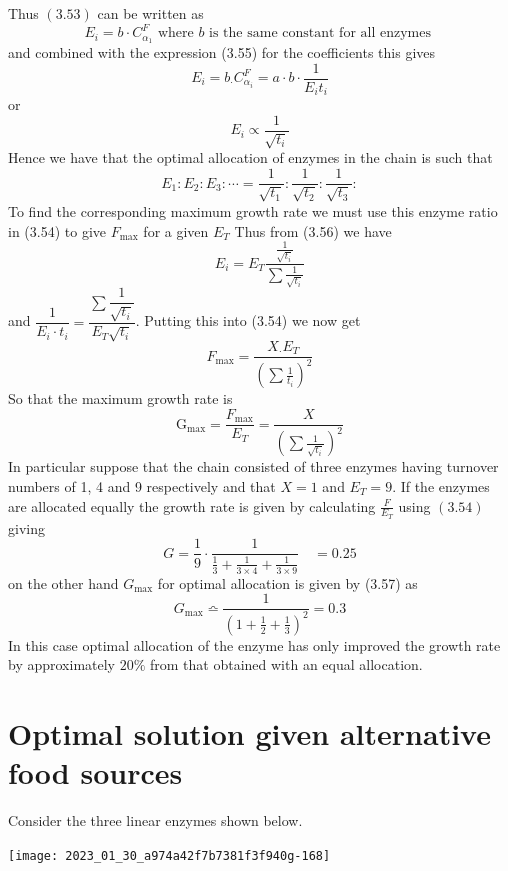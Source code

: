 Thus $(3.53)$ can be written as
%
$$
E_{i}=b \cdot C_{\alpha_{1}}^{F} \text { where } b \text { is the same constant for all enzymes }
$$
%
and combined with the expression (3.55) for the coefficients this gives
%
$$
E_{i}=b_{\cdot} C_{\alpha_{i}}^{F} = a \cdot b \cdot \frac{1}{E_{i} t_{i}}
$$
%
or
%
$$
E_{i} \propto \frac{1}{\sqrt{t_{i}}}
$$
%
Hence we have that the optimal allocation of enzymes in the chain is such that
%
\begin{equation}
E_{1}: E_{2}: E_{3}: \cdots=\frac{1}{\sqrt{t_{1}}}: \frac{1}{\sqrt{t_{2}}}: \frac{1}{\sqrt{t_{3}}}:
\label{eqn:356}
\end{equation}
%
To find the corresponding maximum growth rate we must use this enzyme ratio in (3.54) to give $F_{\max}$ for a given $E_{T}$ Thus from (3.56) we have
%
$$
E_{i} = E_{T} \frac{\frac{1}{\sqrt{t_{i}}}}{\sum \frac{1}{\sqrt{t_{i}}}}
$$
%
and $\dfrac{1}{E_{i} \cdot t_{i}} = \dfrac{\sum \dfrac{1}{\sqrt{t_{i}}}}{E_{T} \sqrt{t_{i}}}$. Putting this into (3.54) we now get
%
$$
F_{\max} = \frac{X_{\cdot} E_{T}}{\left(\sum \frac{1}{t_{i}}\right)^{2}}
$$
%
So that the maximum growth rate is
%
\begin{equation}
\mathrm{G}_{\max } = \frac{F_{\max}}{E_{T}} = \frac{X}{\left(\sum \frac{1}{\sqrt{t_{i}}}\right)^{2}}
\label{eqn:357}
\end{equation}
%
In particular suppose that the chain consisted of three enzymes having turnover numbers of 1, 4 and 9 respectively and that $X=1$ and $E_{T}=9$. If the enzymes are allocated equally the growth rate is given by calculating $\frac{F}{E_{T}}$ using $(3.54)$ giving
%
$$
G=\frac{1}{9} \cdot \frac{1}{\frac{1}{3}+\frac{1}{3 \times 4}+\frac{1}{3 \times 9}} \quad=0.25
$$
%
on the other hand $G_{\max}$ for optimal allocation is given by (3.57) as
%
$$
G_{\max } \bumpeq \frac{1}{\left(1+\frac{1}{2}+\frac{1}{3}\right)^{2}} = 0.3
$$
%
In this case optimal allocation of the enzyme has only improved the growth rate by approximately $20 \%$ from that obtained with an equal allocation.

\section{Optimal solution given alternative food sources}

Consider the three linear enzymes shown below.

\begin{center}
\texttt{[image: 2023\_01\_30\_a974a42f7b7381f3f940g-168]}
\end{center}

